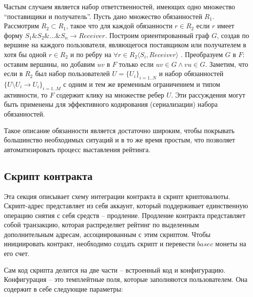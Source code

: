 \documentclass[]{itmo-student-thesis}
\begin{document}
Частым случаем является набор ответственностей, имеющих одно множество
``поставищики и получатель''. Пусть дано множество обязанностей
$R_1$. Рассмотрим $R_2 \subset R_1$, такое что для каждой обязанности
$r \in R_2$ если $r$ имеет форму $S_1\&S_2\&…\&S_n \rightarrow Receiver$. Построим ориентированный граф $G$, создав по вершине на
каждого пользователя, являющегося поставщиком или получателем в хотя
бы одной $r \in R_2$ и по ребру на $\forall r \in R_2 \langle S_i,
Receiver \rangle$ . Преобразуем $G$ в $F$: оставим вершины, но добавим
$uv$ в $F$ только если $uv \in G \wedge vu \in G$. Заметим, что если в
$R_2$ был набор пользователей $U = \{U_i\}_{i=1..N}$ и набор
обязанностей $\{U \setminus U_i \rightarrow U_i\}_{i=1..M}$ с
одним и тем же временным ограничением и типом активности, то $F$
содержит клику на множестве ребер $U$. Эти рассуждения могут быть
применены для эффективного кодирования (сериализации) набора
обязанностей.

Такое описание обязанности является достаточно широким, чтобы
покрывать большинство необходимых ситуаций и в то же время простым,
что позволяет автоматизировать процесс выставления рейтинга.

\subsection{Скрипт контракта}

Эта секция описывает схему интеграции контракта в скрипт
криптовалюты. Скрипт-адрес представляет из себя аккаунт, который
поддерживает единственную операцию снятия с себя средств --
продление. Продление контракта представляет собой транзакцию, которая
распределяет рейтинг по выделенным дополнительным адресам,
ассоциированным с этим скриптом. Чтобы инициировать контракт,
необходимо создать скрипт и перевести $basec$ монеты на его счет.

Сам код скрипта делится на две части -- встроенный код и
конфигурацию. Конфигурация -- это темплейтные поля, которые
заполняются пользователем. Она содержит в себе следующие параметры:
\end{document}
